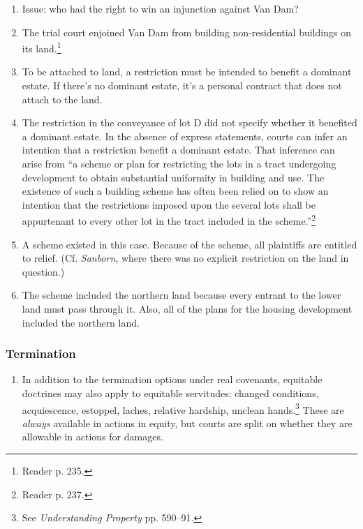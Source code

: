 \begin{enumerate}
    \item Issue: who had the right to win an injunction against Van Dam?
    \item The trial court enjoined Van Dam from building non-residential 
    buildings on its land.\footnote{Reader p. 235.}
    \item To be attached to land, a restriction must be intended to benefit a 
    dominant estate. If there's no dominant estate, it's a personal contract 
    that does not attach to the land.
    \item The restriction in the conveyance of lot D did not specify whether 
    it benefited a dominant estate. In the absence of express statements, 
    courts can infer an intention that a restriction benefit a dominant 
    estate. That inference can arise from ``a scheme or plan for restricting 
    the lots in a tract undergoing development to obtain substantial 
    uniformity in building and use. The existence of such a building scheme 
    has often been relied on to show an intention that the restrictions 
    imposed upon the several lots shall be appurtenant to every other lot in 
    the tract included in the scheme.''\footnote{Reader p. 237.}
    \item A scheme existed in this case. Because of the scheme, all plaintiffs 
    are entitled to relief. (Cf. \emph{Sanborn}, where there was no explicit 
    restriction on the land in question.)
    \item The scheme included the northern land because every entrant to the 
    lower land must pass through it. Also, all of the plans for the housing 
    development included the northern land.
\end{enumerate}

\subsubsection{Termination}

\begin{enumerate}
    \item In addition to the termination options under real covenants, 
    equitable doctrines may also apply to equitable servitudes: changed 
    conditions, acquiescence, estoppel, laches, relative hardship, unclean 
    hands.\footnote{See \emph{Understanding Property} pp. 590--91.} These are 
    \emph{always} available in actions in equity, but courts are split on 
    whether they are allowable in actions for damages.
\end{enumerate}

